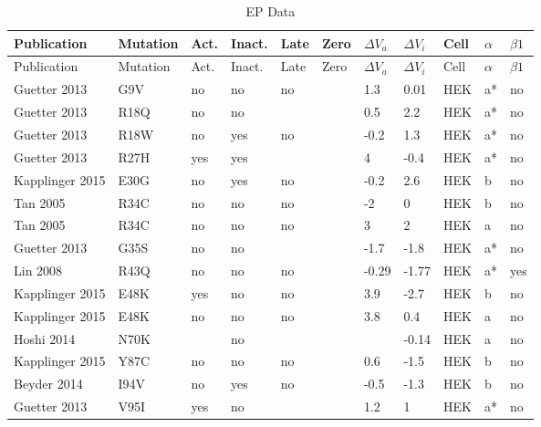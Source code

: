 \begin{tiny}
\startrowcolors
\begin{longtable}{p{4cm}|l|llll|ll|lll}
\caption{\label{tab:epdata}EP Data} \\
\hline
Publication & Mutation & Act. & Inact. & Late & Zero & ${\Delta}V_a$ & ${\Delta}V_i$ & Cell & $\alpha$ & $\beta1$ \\
\hline
\endfirsthead\hline
\rowcolor{white}
Publication & Mutation & Act. & Inact. & Late & Zero & ${\Delta}V_a$ & ${\Delta}V_i$ & Cell & $\alpha$ & $\beta1$ \\
\hline
\endhead
\hline
\endfoot
Guetter 2013\cite{Guetter2013MutationDB} & G9V & no & no & no &  & 1.3 & 0.01 & HEK & a* & no \\
Guetter 2013\cite{Guetter2013MutationDB} & R18Q & no & no &  &  & 0.5 & 2.2 & HEK & a* & no \\
Guetter 2013\cite{Guetter2013MutationDB} & R18W & no & yes & no &  & -0.2 & 1.3 & HEK & a* & no \\
Guetter 2013\cite{Guetter2013MutationDB} & R27H & yes & yes &  &  & 4 & -0.4 & HEK & a* & no \\
Kapplinger 2015\cite{Kapplinger2015MutationDB} & E30G & no & yes & no &  & -0.2 & 2.6 & HEK & b & no \\
Tan 2005\cite{Tan2005MutationDB} & R34C & no & no & no &  & -2 & 0 & HEK & b & no \\
Tan 2005\cite{Tan2005MutationDB} & R34C & no & no & no &  & 3 & 2 & HEK & a & no \\
Guetter 2013\cite{Guetter2013MutationDB} & G35S & no & no &  &  & -1.7 & -1.8 & HEK & a* & no \\
Lin 2008\cite{Lin2008MutationDB} & R43Q & no & no & no &  & -0.29 & -1.77 & HEK & a* & yes \\
Kapplinger 2015\cite{Kapplinger2015MutationDB} & E48K & yes & no & no &  & 3.9 & -2.7 & HEK & b & no \\
Kapplinger 2015\cite{Kapplinger2015MutationDB} & E48K & no & no & no &  & 3.8 & 0.4 & HEK & a & no \\
Hoshi 2014\cite{Hoshi2014MutationDB} & N70K &  & no &  &  &  & -0.14 & HEK & a & no \\
Kapplinger 2015\cite{Kapplinger2015MutationDB} & Y87C & no & no & no &  & 0.6 & -1.5 & HEK & b & no \\
Beyder 2014\cite{Beyder2014MutationDB} & I94V & no & yes & no &  & -0.5 & -1.3 & HEK & b & no \\
Guetter 2013\cite{Guetter2013MutationDB} & V95I & yes & no &  &  & 1.2 & 1 & HEK & a* & no \\

\end{longtable}
\end{tiny}

